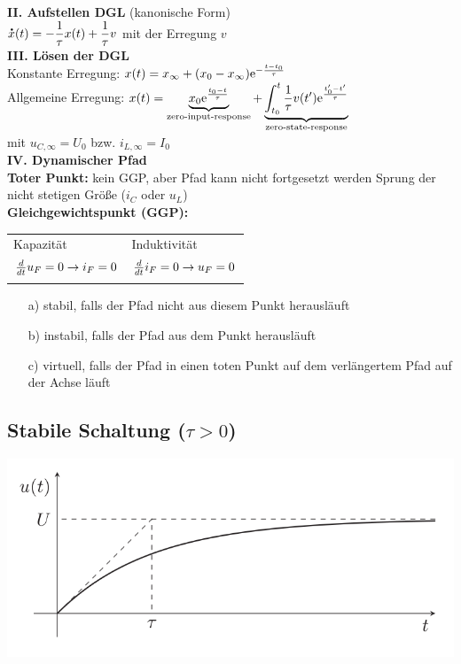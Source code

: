 \documentclass[fs, footer]{latex4ei}
\begin{document}
\begin{multicols*}{4}
{    \textbf{II. Aufstellen DGL} (kanonische Form)\\
    $\accentset{\mbox{\textrm{\large\bfseries .}} }{x}(t) = - \dfrac{1}{\tau}x(t) + \dfrac{1}{\tau}v$ mit der Erregung $v$\\
    \textbf{III. Lösen der DGL}\\
    Konstante Erregung:  $x(t) = x_\infty + (x_0 - x_\infty )\mathrm{e}^{-\frac{t-t_0}{\tau}}$ \\
    Allgemeine Erregung: $x(t) = \underbrace{x_0\mathrm{e}^{\frac{t_0-t}{\tau}}}_{\text{zero-input-response}}+\underbrace{\int_{t_0}^t{\frac{1}{\tau}v(t')\mathrm{e}^{\frac{t'_0-t'}{\tau}}}}_{\text{zero-state-response}}$ \\
    mit $u_{C,\infty}=U_0$ bzw. $i_{L,\infty}=I_0$\\
    \textbf{IV. Dynamischer Pfad}\\
    \textbf{Toter Punkt:} kein GGP, aber Pfad kann nicht fortgesetzt werden \ra Sprung der nicht stetigen Größe ($i_C$ oder $u_L$)\\
    \textbf{Gleichgewichtspunkt (GGP):}\\
    \begin{tabular*}{\columnwidth}{@{\extracolsep\fill}ll@{}}
        Kapazität & Induktivität\\ \mrule
        $\frac{d}{dt}u_F = 0 \rightarrow i_F = 0$ & $\frac{d}{dt}i_F = 0 \rightarrow u_F = 0$\\
        \mrule
    \end{tabular*}
    \begin{itemize}
        \item[a)] stabil, falls der Pfad nicht aus diesem Punkt herausläuft
        \item[b)] instabil, falls der Pfad aus dem Punkt herausläuft
        \item[c)] virtuell, falls der Pfad in einen toten Punkt auf dem verlängertem Pfad auf der Achse läuft
    \end{itemize}
    }

    \subsection{Stabile Schaltung ($\tau > 0$)}
    \includegraphics[width=.8\linewidth]{img/graph-stabil}

\end{multicols*}
\end{document}
